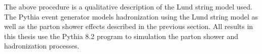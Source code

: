 The above procedure is a qualitative description of the Lund string model used.
The Pythia event generator models hadronization using the Lund string model as well as the parton shower effects described in the previous section.
All results in this thesis use the Pythia 8.2 program to simulation the parton shower and hadronization processes. 
